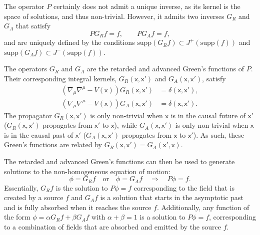 \documentclass[letterpaper,12pt,titlepage,oneside,final]{book}
\newcommand{\mf}{\mathsf}%
\begin{document}
The operator $P$ certainly does not admit a unique inverse, as its kernel is the space of solutions, and thus non-trivial. However, it admits two inverses $G_R$ and $G_A$ that satisfy
\begin{equation}\label{eq:GRGAcov}
    P G_R f = f, \quad \quad P G_A f = f,
\end{equation}
and are uniquely defined by the conditions $\text{supp}(G_Rf) \subset J^+(\text{supp}(f))$ and $\text{supp}(G_Af) \subset J^-(\text{supp}(f))$.

The operators $G_R$ and $G_A$ are the retarded and advanced Green's functions of $P$. Their corresponding integral kernels, $G_R(\mf x, \mf x')$ and $G_A(\mf x, \mf x')$, satisfy
\begin{align}
    (\nabla_\mu \nabla^\mu - V(\mf x))G_R(\mf x, \mf x') &= \delta(\mf x, \mf x'),\\ (\nabla_\mu \nabla^\mu - V(\mf x))G_A(\mf x, \mf x') &= \delta(\mf x, \mf x').
\end{align}
The propagator $G_R(\mf x, \mf x')$ is only non-trivial when $\mf x$ is in the causal future of $\mf x'$ ($G_R(\mf x, \mf x')$ propagates from $\mf x'$ to $\mf x$), while $G_A(\mf x, \mf x')$ is only non-trivial when $\mf x$ is in the causal past of $\mf x'$ ($G_A(\mf x, \mf x')$ propagates from $\mf x$ to $\mf x'$). As such, these Green's functions are related by $G_R(\mf x, \mf x') = G_A(\mf x', \mf x)$.

The retarded and advanced Green's functions can then be used to generate solutions to the non-homogeneous equation of motion:
\begin{equation}\label{eq:GRGAdelta}
    \phi = G_Rf\quad \text{or}\quad \phi = G_Af \quad \Rightarrow \quad  P\phi = f.
\end{equation}
Essentially, $G_Rf$ is the solution to $P\phi = f$ corresponding to the field that is created by a source $f$ and $G_Af$ is a solution that starts in the asymptotic past and is fully absorbed when it reaches the source $f$. Additionally, any function of the form $\phi = \alpha G_Rf + \beta G_Af$ with $\alpha + \beta = 1$ is a solution to $P\phi = f$, corresponding to a combination of fields that are absorbed and emitted by the source $f$.
\end{document}
